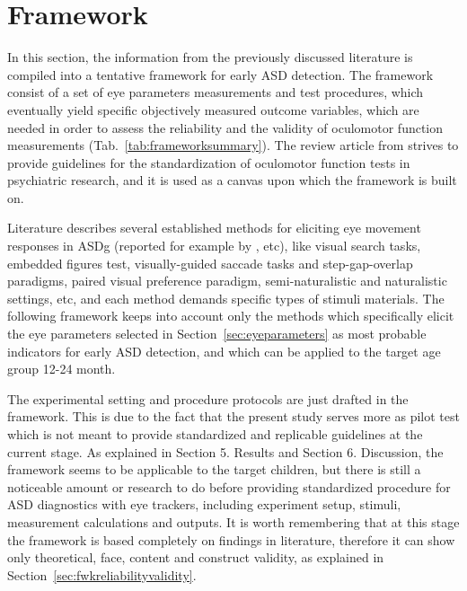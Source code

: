 \chapter{Framework}
\label{chap:framework}

In this section, the information from the previously discussed literature is compiled into a tentative framework for early ASD detection. The framework consist of a set of eye parameters measurements and test procedures, which eventually yield specific objectively measured outcome variables, which are needed in order to assess the reliability and the validity of oculomotor function measurements (Tab.~\ref{tab:frameworksummary}). The review article from \cite{smyrnis2008guidelines} strives to provide guidelines for the standardization of oculomotor function tests in psychiatric research, and it is used as a canvas upon which the framework is built on. 

Literature describes several established methods for eliciting eye movement responses in ASDg (reported for example by \citealp{johnson2016review,brenner2007visualsearch,zalla2016saccades,falck-ytter2013eyetrackingASD,papagiannopoulou2014review}, etc), like visual search tasks, embedded figures test, visually-guided saccade tasks and step-gap-overlap paradigms, paired visual preference paradigm, semi-naturalistic and naturalistic settings, etc, and each method demands specific types of stimuli materials. The following framework keeps into account only the methods which specifically elicit the eye parameters selected in Section~\ref{sec:eyeparameters} as most probable indicators for early ASD detection, and which can be applied to the target age group 12-24 month.

The experimental setting and procedure protocols are just drafted in the framework. This is due to the fact that the present study serves more as pilot test which is not meant to provide standardized and replicable guidelines at the current stage. As explained in Section 5. Results and Section 6. Discussion, the framework seems to be applicable to the target children, but there is still a noticeable amount or research to do before providing standardized procedure for ASD diagnostics with eye trackers, including experiment setup, stimuli, measurement calculations and outputs.
It is worth remembering that at this stage the framework is based completely on findings in literature, therefore it can show only theoretical, face, content and construct validity, as explained in Section~\ref{sec:fwkreliabilityvalidity}.

